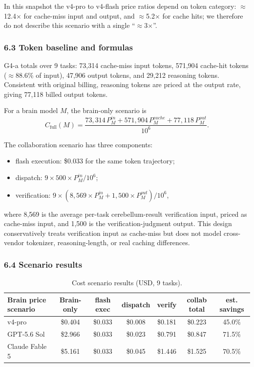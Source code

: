 \documentclass[
]{article}
\begin{document}
In this snapshot the v4-pro to v4-flash price ratios depend on token category: $\approx$12.4$\times$ for cache-miss input and output, and $\approx$5.2$\times$ for cache hits; we therefore do not describe this scenario with a single ``$\approx$3$\times$''.

\subsubsection{6.3 Token baseline and formulas}
G4-a totals over 9 tasks: 73,314 cache-miss input tokens, 571,904 cache-hit tokens ($\approx$88.6\% of input), 47,906 output tokens, and 29,212 reasoning tokens. Consistent with original billing, reasoning tokens are priced at the output rate, giving 77,118 billed output tokens.

For a brain model $M$, the brain-only scenario is
\begin{equation}
C_{\mathrm{full}}(M)=\frac{73{,}314\,P_M^{in}+571{,}904\,P_M^{cache}+77{,}118\,P_M^{out}}{10^6}.
\end{equation}

The collaboration scenario has three components:
\begin{itemize}
\item flash execution: \$0.033 for the same token trajectory;
\item dispatch: $9\times500\times P_M^{in}/10^6$;
\item verification: $9\times(8{,}569\times P_M^{in}+1{,}500\times P_M^{out})/10^6$,
\end{itemize}
where 8,569 is the average per-task cerebellum-result verification input, priced as cache-miss input, and 1,500 is the verification-judgment output. This design conservatively treats verification input as cache-miss but does not model cross-vendor tokenizer, reasoning-length, or real caching differences.

\subsubsection{6.4 Scenario results}
\begin{table}[ht]
\centering
\small
\begin{tabular}{lcccccc}
\toprule
Brain price scenario & Brain-only & flash exec & dispatch & verify & collab total & est. savings \\
\midrule
v4-pro & \$0.404 & \$0.033 & \$0.008 & \$0.181 & \$0.223 & 45.0\% \\
GPT-5.6 Sol & \$2.966 & \$0.033 & \$0.023 & \$0.791 & \$0.847 & 71.5\% \\
Claude Fable 5 & \$5.161 & \$0.033 & \$0.045 & \$1.446 & \$1.525 & 70.5\% \\
\bottomrule
\end{tabular}
\caption{Cost scenario results (USD, 9 tasks).}
\label{tab:cost}
\end{table}
\end{document}
